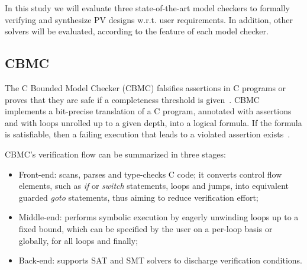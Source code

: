 
In this study we will evaluate three state-of-the-art model checkers to formally verifying and synthesize PV designs w.r.t. user requirements. In addition, other solvers will be evaluated, according to the feature of each model checker.

\subsection{CBMC}

The C Bounded Model Checker (CBMC) falsifies assertions in C programs or proves that they are safe if a completeness threshold is given~\cite{Kroening}. CBMC implements a bit-precise translation of a C program, annotated with assertions and with loops unrolled up to a given depth, into a logical formula. If the formula is satisfiable, then a failing execution that leads to a violated assertion exists~\cite{Kroening}. 

CBMC's verification flow can be summarized in three stages: 

\begin{itemize}
\item Front-end: scans, parses and type-checks C code; it converts control flow elements, such as \textit{if} or \textit{switch} statements, loops and jumps, into equivalent guarded \textit{goto} statements, thus aiming to reduce verification effort; 
\item Middle-end: performs symbolic execution by eagerly unwinding loops up to a fixed bound, which can be specified by the user on a per-loop basis or globally, for all loops and finally; 
\item Back-end: supports SAT and SMT solvers to discharge verification conditions.
\end{itemize}

